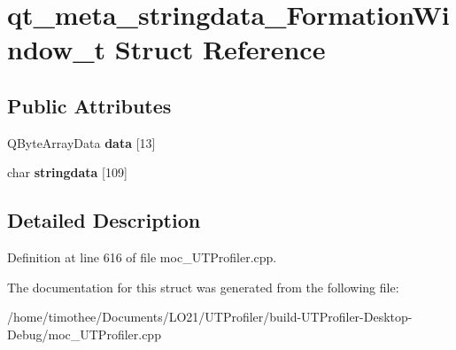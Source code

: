 \hypertarget{structqt__meta__stringdata___formation_window__t}{\section{qt\-\_\-meta\-\_\-stringdata\-\_\-\-Formation\-Window\-\_\-t Struct Reference}
\label{structqt__meta__stringdata___formation_window__t}
}
\subsection*{Public Attributes}
\begin{DoxyCompactItemize}
\item 
\hypertarget{structqt__meta__stringdata___formation_window__t_a416d542b4210f16927582f25e93d835b}{Q\-Byte\-Array\-Data {\bfseries data} \mbox{[}13\mbox{]}}\label{structqt__meta__stringdata___formation_window__t_a416d542b4210f16927582f25e93d835b}

\item 
\hypertarget{structqt__meta__stringdata___formation_window__t_a77e6f6fc0cc270b369d4fe6beb7823df}{char {\bfseries stringdata} \mbox{[}109\mbox{]}}\label{structqt__meta__stringdata___formation_window__t_a77e6f6fc0cc270b369d4fe6beb7823df}

\end{DoxyCompactItemize}


\subsection{Detailed Description}


Definition at line 616 of file moc\-\_\-\-U\-T\-Profiler.\-cpp.



The documentation for this struct was generated from the following file\-:\begin{DoxyCompactItemize}
\item 
/home/timothee/\-Documents/\-L\-O21/\-U\-T\-Profiler/build-\/\-U\-T\-Profiler-\/\-Desktop-\/\-Debug/moc\-\_\-\-U\-T\-Profiler.\-cpp\end{DoxyCompactItemize}

